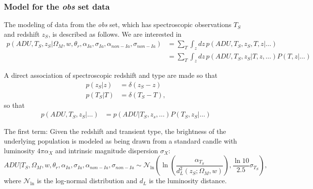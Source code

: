 \documentclass[preprint]{aastex}
\begin{document}
\subsubsection{Model for the {\it obs} set data}
The modeling of data from the {\it obs} set, which has
spectroscopic observations $T_S$ and redshift
$z_S$, is described as follows.  We are interested in
\begin{align}
p(\mathit{ADU}, {{T}}_S,{{z}}_S|  \Omega_M, w, \theta_r,\alpha_{Ia},\sigma_{Ia}, \alpha_{\mathit{non-Ia}},\sigma_{\mathit{non-Ia}})  &=\sum_T \int_z dz\,
p(\mathit{ADU}, {{T}}_S,{{z}}_S, T, z| \ldots)\\
&= \sum_T \int_z dz\,
p(\mathit{ADU}, {{T}}_S,{{z}}_S| T, z,\dots) P(T,z | \ldots)
\end{align}

A direct association of spectroscopic redshift and type are made so that
\begin{align}
p(z_S|z) &= \delta(z_S-z)\\
p(T_S|T) &= \delta(T_S-T),
\label{specz:eqn}
\end{align}
so that
\begin{align}
p(\mathit{ADU}, {{T}}_S,{{z}}_S|  \ldots) &= 
p(\mathit{ADU}| T_S, z_s,\dots) P(T_S,z_S | \ldots)
\end{align}

The first term: Given the redshift
and transient type, the brightness of the underlying population
is modeled as being drawn from a standard candle
with luminosity $4\pi\alpha_X$ and intrinsic magnitude dispersion  $\sigma_X$:
\begin{equation}
\mathit{ADU}| T_S, \Omega_M, w, \theta_r, \alpha_{Ia},\sigma_{Ia}, \alpha_{\mathit{non-Ia}},\sigma_{\mathit{non-Ia}} \sim \mathcal{N}_{\ln}\left(\ln{\left(\frac{\alpha_{T_S}}{d_L^2(z_S;\Omega_M, w)}\right)}, \frac{\ln{10}}{2.5}\sigma_{T_S}\right),
\end{equation}
where $\mathcal{N}_{\ln}$ is the log-normal distribution and $d_L$ is the luminosity distance.
\end{document}
